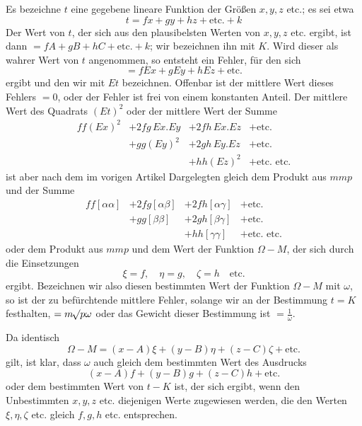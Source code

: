 Es bezeichne \(t\) eine gegebene lineare Funktion der Größen \(x,y,z\) etc.; es sei etwa
\[
t=fx+gy+hz+\text{etc.}+k
\]
Der Wert von \(t\), der sich aus den plausibelsten Werten von \(x,y,z\) etc. ergibt, ist dann \(=fA+gB+hC+\text{etc.}+k\); wir bezeichnen ihn mit \(K\). Wird dieser als wahrer Wert von \(t\) angenommen, so entsteht ein Fehler, für den sich
\[
=fEx+gEy+hEz+\text{etc.}
\]
ergibt und den wir mit \(Et\) bezeichnen. Offenbar ist der mittlere Wert dieses Fehlers \(=0\), oder der Fehler ist frei von einem konstanten Anteil. Der mittlere Wert des Quadrats \((Et)^2\) oder der mittlere Wert der Summe
\[
\begin{array}{llll}
ff(Ex)^2&+2fg\,Ex.Ey&+2fh\,Ex.Ez&+\text{etc.}\\
&+gg(Ey)^2&+2gh\,Ey.Ez&+\text{etc.}\\
&&+hh(Ez)^2&+\text{etc. etc.}
\end{array}
\]
ist aber nach dem im vorigen Artikel Dargelegten gleich dem Produkt aus \(mmp\) und der Summe
\[
\begin{array}{llll}
ff[\alpha\alpha]&+2fg[\alpha\beta]&+2fh[\alpha\gamma]&+\text{etc.}\\
&+gg[\beta\beta]&+2gh[\beta\gamma]&+\text{etc.}\\
&&+hh[\gamma\gamma]&+\text{etc. etc.}
\end{array}
\]
oder dem Produkt aus \(mmp\) und dem Wert der Funktion \(\Omega-M\), der sich durch die Einsetzungen
\[
\xi=f,\quad\eta=g,\quad\zeta=h\quad\text{etc.}
\]
ergibt. Bezeichnen wir also diesen bestimmten Wert der Funktion \(\Omega-M\) mit \(\omega\), so ist der zu befürchtende mittlere Fehler, solange wir an der Bestimmung \(t=K\) festhalten, \(=m\mathord{{}^{}\!\surd}p\omega\) oder das Gewicht dieser Bestimmung ist \(=\frac1\omega\).

Da identisch
\[
\Omega-M=(x-A)\xi+(y-B)\eta+(z-C)\zeta+\text{etc.}
\]
gilt, ist klar, dass \(\omega\) auch gleich dem bestimmten Wert des Ausdrucks
\[
(x-A)f+(y-B)g+(z-C)h+\text{etc.}
\]
oder dem bestimmten Wert von \(t-K\) ist, der sich ergibt, wenn den Unbestimmten \(x,y,z\) etc. diejenigen Werte zugewiesen werden, die den Werten \(\xi,\eta,\zeta\) etc. gleich \(f,g,h\) etc. entsprechen.

